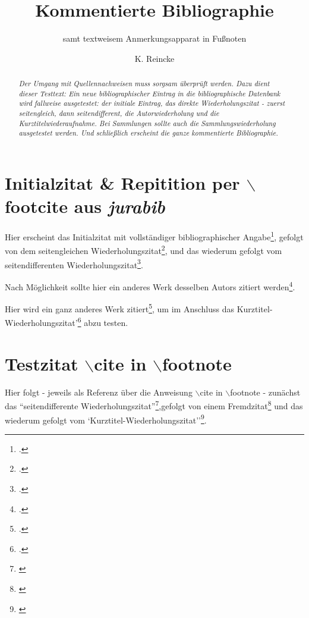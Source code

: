 \documentclass[DIV=calc,BCOR=5mm,11pt,headings=small,oneside,abstract=true, toc=bib]{scrartcl}
\begin{document}
\nocite{*}

\titlehead{Bibliographietest}
\subject{Zum Testen \itshape{neuer bibliographischer Angaben}}
\title{Kommentierte Bibliographie}
\subtitle{samt textweisem Anmerkungsapparat in Fußnoten}
\author{K. Reincke}

\maketitle

\begin{abstract}
\noindent \itshape
Der Umgang mit Quellennachweisen muss sorgsam überprüft werden. Dazu dient
dieser Testtext: Ein neue bibliographischer Eintrag in die bibliographische
Datenbank wird fallweise ausgetestet: der initiale Eintrag, das direkte
Wiederholungszitat - zuerst seitengleich, dann seitendifferent, die
Autorwiederholung und die Kurztitelwiederaufnahme. Bei Sammlungen sollte auch
die Sammlungswiederholung ausgetestet werden. Und schließlich erscheint die
ganze kommentierte Bibliographie.
\end{abstract}

\section{Initialzitat \& Repitition per $\backslash$footcite aus \emph{jurabib}}

Hier erscheint das \glqq Initialzitat mit vollständiger bibliographischer
Angabe\grqq\footcite[vgl. dazu:][123ff]{Buchtala2007a}, gefolgt von dem \glqq
seitengleichen Wiederholungszitat\grqq\footcite[vgl. dazu:][123ff]{Buchtala2007a},
und das wiederum gefolgt vom \glqq seitendifferenten
Wiederholungszitat\grqq\footcite[vgl. dazu:][125f]{Buchtala2007a}.

Nach Möglichkeit sollte hier ein anderes Werk desselben Autors zitiert
werden\footcite[vgl. dazu:][321]{Buchtala2007a}.

Hier wird ein ganz anderes Werk zitiert\footcite[vgl.
dazu:][42]{Spielkamp2008a}, um im Anschluss das \glqq
Kurztitel-Wiederholungszitat'\grqq\footcite[vgl. dazu:][123]{Buchtala2007a} abzu
testen.

\section{Testzitat $\backslash$cite in $\backslash$footnote}

Hier folgt - jeweils als Referenz über die Anweisung $\backslash$cite in
$\backslash$footnote - zunächst das ``seitendifferente
Wiederholungszitat''\footnote{\cite[vgl. dazu:][125]{Buchtala2007a}},gefolgt von
einem Fremdzitat\footnote{\cite[vgl. dazu:][42]{Spielkamp2008a}} und das
wiederum gefolgt vom `Kurztitel-Wiederholungszitat''\footnote{\cite[vgl.
dazu:][125]{Buchtala2007a}}.


\small

\end{document}
